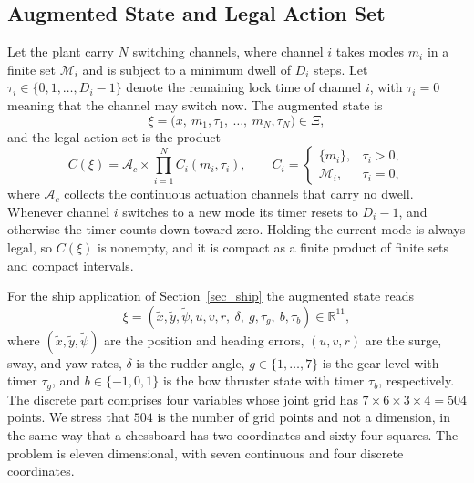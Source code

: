 \documentclass[journal]{IEEEtran}
\begin{document}
\subsection{Augmented State and Legal Action Set}

Let the plant carry $N$ switching channels, where channel $i$ takes modes $m_i$ in a finite set $\mathcal{M}_i$ and is subject to a minimum dwell of $D_i$ steps. Let $\tau_i \in \{0, 1, \ldots, D_i - 1\}$ denote the remaining lock time of channel $i$, with $\tau_i = 0$ meaning that the channel may switch now. The augmented state is
\begin{equation}
\xi = \bigl(x,\ m_1, \tau_1,\ \ldots,\ m_N, \tau_N\bigr) \in \Xi,
\label{eq_xi_general}
\end{equation}
and the legal action set is the product
\begin{equation}
C(\xi) = \mathcal{A}_{c} \times \prod_{i=1}^{N} C_i(m_i, \tau_i), \qquad
C_i = \begin{cases} \{m_i\}, & \tau_i > 0,\\ \mathcal{M}_i, & \tau_i = 0, \end{cases}
\label{eq_legal}
\end{equation}
where $\mathcal{A}_c$ collects the continuous actuation channels that carry no dwell. Whenever channel $i$ switches to a new mode its timer resets to $D_i - 1$, and otherwise the timer counts down toward zero. Holding the current mode is always legal, so $C(\xi)$ is nonempty, and it is compact as a finite product of finite sets and compact intervals.

For the ship application of Section~\ref{sec_ship} the augmented state reads
\begin{equation}
\xi = (\tilde{x}, \tilde{y}, \tilde{\psi}, u, v, r,\ \delta,\ g, \tau_g,\ b, \tau_b) \in \mathbb{R}^{11},
\label{eq_xi_ship}
\end{equation}
where $(\tilde{x}, \tilde{y}, \tilde{\psi})$ are the position and heading errors, $(u, v, r)$ are the surge, sway, and yaw rates, $\delta$ is the rudder angle, $g \in \{1, \ldots, 7\}$ is the gear level with timer $\tau_g$, and $b \in \{-1, 0, 1\}$ is the bow thruster state with timer $\tau_b$, respectively. The discrete part comprises four variables whose joint grid has $7 \times 6 \times 3 \times 4 = 504$ points. We stress that $504$ is the number of grid points and not a dimension, in the same way that a chessboard has two coordinates and sixty four squares. The problem is eleven dimensional, with seven continuous and four discrete coordinates.
\end{document}
